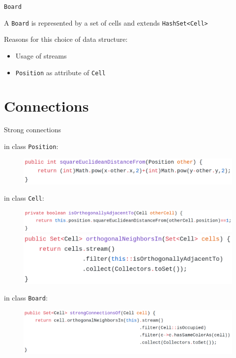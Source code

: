 \documentclass{beamer}
\begin{document}
\begin{frame}{\texttt{Board}}

A \texttt{Board} is represented by a set of cells and extends \texttt{HashSet<Cell>} 

\vspace{0.5cm}
Reasons for this choice of data structure:
\begin{itemize}
    \item Usage of streams
    \item \texttt{Position} as attribute of \texttt{Cell}    
\end{itemize}


\end{frame}


\section{Connections}


\begin{frame}{Strong connections}


	in class \texttt{Position}:

	\begin{figure}
		\raggedright
		\includegraphics[scale=0.15]{images/position.png}
	\end{figure}
	in class \texttt{Cell}:

	\begin{figure}
		\raggedright
		\includegraphics[scale=0.15]{images/cell1.png}
		\includegraphics[scale=0.15]{images/cell2.png}
	\end{figure}

	
	in class \texttt{Board}:

	\begin{figure}
		\raggedright
		\includegraphics[scale=0.15]{images/board1.png}
	\end{figure}


	
\end{frame}
\end{document}
